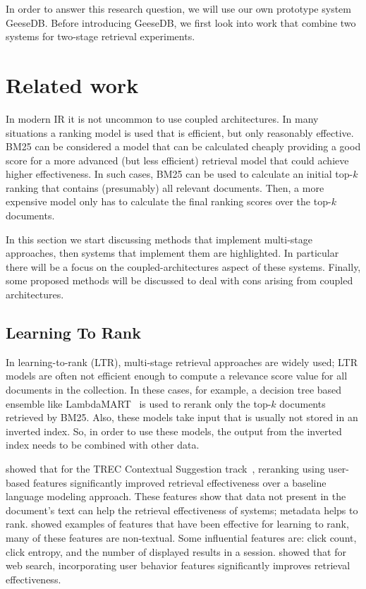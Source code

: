 In order to answer this research question, we will use our own prototype system GeeseDB. Before introducing GeeseDB, we first look into work that combine two systems for two-stage retrieval experiments.


\section{Related work }
In modern IR it is not uncommon to use coupled architectures. In many situations a ranking model is used that is efficient, but only reasonably effective. BM25 can be considered a model that can be calculated cheaply providing a good score for a more advanced (but less efficient) retrieval model that could achieve higher effectiveness. In such cases, BM25 can be used to calculate an initial top-$k$ ranking that contains (presumably) all relevant documents. Then, a more expensive model only has to calculate the final ranking scores over the top-$k$ documents.

In this section we start discussing methods that implement multi-stage approaches, then systems that implement them are highlighted. In particular there will be a focus on the coupled-architectures aspect of these systems. Finally, some proposed methods will be discussed to deal with cons arising from coupled architectures. 

\subsection{Learning To Rank}
In learning-to-rank (LTR), multi-stage retrieval approaches are widely used; LTR models are often not efficient enough to compute a relevance score value for all documents in the collection.
In these cases, for example, a decision tree based ensemble like LambdaMART~\citep{lambdamart} is used to rerank only the top-$k$ documents retrieved by BM25. Also, these models take input that is usually not stored in an inverted index. So, in order to use these models, the output from the inverted index needs to be combined with other data.

 showed that for the TREC Contextual Suggestion track~\citep{contextual-suggestion-track}, reranking using user-based features significantly improved retrieval effectiveness over a baseline language modeling approach. These features show that data not present in the document's text can help the retrieval effectiveness of systems; metadata helps to rank.  showed examples of features that have been effective for learning to rank, many of these features are non-textual. Some influential features are: click count, click entropy, and the number of displayed results in a session.  showed that for web search, incorporating user behavior features significantly improves retrieval effectiveness.

